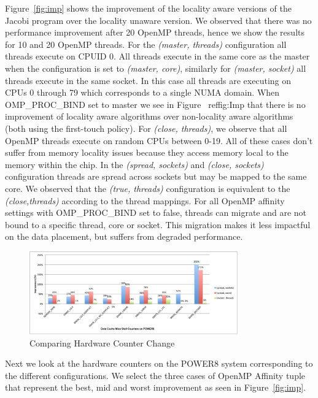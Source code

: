 Figure~\ref{fig:imp} shows the improvement of the locality aware versions of the Jacobi program over the locality unaware version. We observed that there was no performance improvement after 20 OpenMP threads, hence we show the results for 10 and 20 OpenMP threads.
For the \textit{(master, threads)} configuration all threads execute on CPUID 0. 
All threads execute in the same core as the master when the configuration is set to \textit{(master, core)}, similarly for \textit{(master, socket)} all threads execute in the same socket. In this case all threads are executing on CPUs 0 through 79 which corresponds to a single NUMA domain. When OMP\_PROC\_BIND set to master we see in Figure ~ref{fig:Imp} that there is no improvement of locality aware algorithms over non-locality aware algorithms (both using the first-touch policy).
For \textit{(close, threads)}, we observe that all OpenMP threads execute on random CPUs between 0-19. All of these cases don't suffer from memory locality issues because they access memory local to the memory within the chip.
In the \textit{(spread, sockets)} and \textit{(close, sockets)} configuration threads are spread across sockets but may be mapped to the same core. We observed that the \textit{(true, threads)} configuration is equivalent to the \textit{(close,threads)} according to the thread mappings.
For all OpenMP affinity settings  with OMP\_PROC\_BIND set to false, threads can migrate and are not bound to a specific thread, core or socket. This migration makes it less impactful on the data placement, but suffers from degraded performance.
\begin{figure}[h!]
  \centering
  \includegraphics[height=0.4\textwidth, width=0.8\textwidth]{./Images/HW.pdf}
       \caption{Comparing Hardware Counter Change}
       \label{fig:HW}
\end{figure}
%
Next we look at the hardware counters on the POWER8 system corresponding to the different configurations. 
We select the three cases of OpenMP Affinity tuple that represent the best, mid and worst improvement as seen in Figure~\ref{fig:imp}. 

